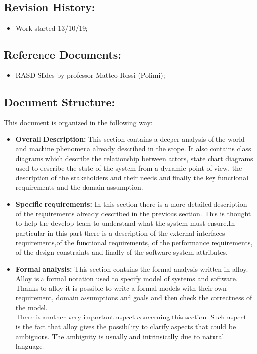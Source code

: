 \documentclass[titlepage]{article}
\begin{document}
\subsection{Revision History: }

\begin{itemize}

	\item Work started 13/10/19;

\end{itemize}

\subsection{Reference Documents:}
\begin{itemize}
	\item RASD Slides by professor Matteo Rossi (Polimi);
\end{itemize}
\subsection{Document Structure: }
This document is organized in the following way:
\begin{itemize}
	\item \textbf{Overall Description:} This section contains a deeper analysis of the world and machine phenomena already described in the scope. It also contains class diagrams which describe the relationship between actors, state chart diagrams used to describe the state of the system from a dynamic point of view, the description of the stakeholders and their needs and finally the key functional requirements and the domain assumption.
	
	\item \textbf{Specific requirements:} In this section there is a more detailed description of the requirements already described in the previous section. This is thought to help the develop team to understand what the system must ensure.In particular in this part there is a description of the external interfaces requirements,of the functional requirements, of the performance requirements, of the design constraints and finally of the software system attributes.
	
	\item \textbf{Formal analysis:} This section contains the formal analysis written in alloy. Alloy is a formal notation used to specify model of systems and software. Thanks to alloy it is possible to write a formal models with their own requirement, domain assumptions and goals and then check the correctness of the model.\\
There is another very important aspect concerning this section. Such aspect is the fact that alloy gives the possibility to clarify aspects that could be ambiguous. The ambiguity is usually and intrinsically due to natural language. 
\end{itemize}
\newpage
\end{document}
